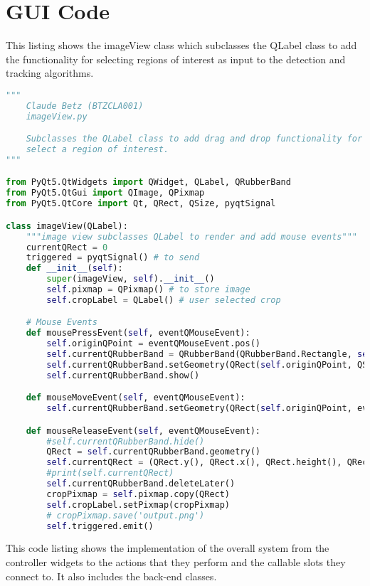 \newpage
\section{GUI Code}
This listing shows the imageView class which subclasses the QLabel class to
add the functionality for selecting regions of interest as input to the
detection and tracking algorithms.
\begin{lstlisting}[language=Python, caption={QLabel Mouse Event Code}, captionpos=b, label={lst:gui}]
"""
    Claude Betz (BTZCLA001)
    imageView.py

    Subclasses the QLabel class to add drag and drop functionality for a User to
    select a region of interest.
"""

from PyQt5.QtWidgets import QWidget, QLabel, QRubberBand
from PyQt5.QtGui import QImage, QPixmap
from PyQt5.QtCore import Qt, QRect, QSize, pyqtSignal

class imageView(QLabel):
    """image view subclasses QLabel to render and add mouse events"""
    currentQRect = 0
    triggered = pyqtSignal() # to send
    def __init__(self):
        super(imageView, self).__init__()
        self.pixmap = QPixmap() # to store image
        self.cropLabel = QLabel() # user selected crop

    # Mouse Events
    def mousePressEvent(self, eventQMouseEvent):
        self.originQPoint = eventQMouseEvent.pos()
        self.currentQRubberBand = QRubberBand(QRubberBand.Rectangle, self)
        self.currentQRubberBand.setGeometry(QRect(self.originQPoint, QSize()))
        self.currentQRubberBand.show()

    def mouseMoveEvent(self, eventQMouseEvent):
        self.currentQRubberBand.setGeometry(QRect(self.originQPoint, eventQMouseEvent.pos()).normalized())

    def mouseReleaseEvent(self, eventQMouseEvent):
        #self.currentQRubberBand.hide()
        QRect = self.currentQRubberBand.geometry()
        self.currentQRect = (QRect.y(), QRect.x(), QRect.height(), QRect.width())
        #print(self.currentQRect)
        self.currentQRubberBand.deleteLater()
        cropPixmap = self.pixmap.copy(QRect)
        self.cropLabel.setPixmap(cropPixmap)
        # cropPixmap.save('output.png')
        self.triggered.emit()
\end{lstlisting}

This code listing shows the implementation of the overall system from the controller
widgets to the actions that they perform and the callable slots they connect to.
It also includes the back-end classes. 


